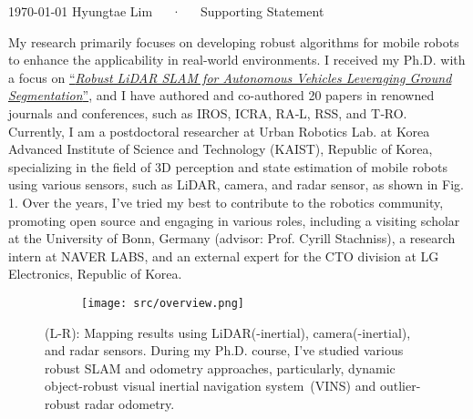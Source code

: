 \documentclass[11pt, a4paper]{../awesome-cv}
\begin{document}
\makecvheader[R]

\makecvfooter
  {\today}
  {Hyungtae Lim~~~·~~~Supporting Statement}
  {}


\begin{cvletter}


My research primarily focuses on developing robust algorithms for mobile robots to enhance the applicability in real-world environments.
I received my Ph.D. with a focus on \href{https://www.dropbox.com/s/0j64sbsrhpyjdgm/hyungtae_lim_dissertation.pdf?dl=0}{``\textit{Robust LiDAR SLAM for Autonomous Vehicles Leveraging Ground Segmentation}''},
and I have authored and co-authored 20 papers in renowned journals and conferences, such as IROS, ICRA, RA‑L, RSS, and T‑RO.
Currently, I am a postdoctoral researcher at Urban Robotics Lab. at Korea Advanced Institute of Science and Technology (KAIST), Republic of Korea, specializing in the field of 3D perception and state estimation of mobile robots using various sensors, such as LiDAR, camera, and radar sensor, as shown in Fig. 1.
Over the years, I've tried my best to contribute to the robotics community, promoting open source and engaging in various roles, including a visiting scholar at the University of Bonn, Germany (advisor: Prof. Cyrill Stachniss), a research intern at NAVER LABS, and an external expert for the CTO division at LG Electronics, Republic of Korea.


\begin{figure}[h!]
	\centering
	\begin{subfigure}[b]{0.98\textwidth}
		\texttt{[image: src/overview.png]}
	\end{subfigure}
	\captionsetup{font=footnotesize}
	\caption{(L-R): Mapping results using LiDAR(-inertial), camera(-inertial), and radar sensors. During my Ph.D. course, I've studied various robust SLAM and odometry approaches, particularly, dynamic object-robust visual inertial navigation system~(VINS) and outlier-robust radar odometry.}
	\label{figure:mainfig}
\end{figure}


\end{cvletter}
\end{document}
